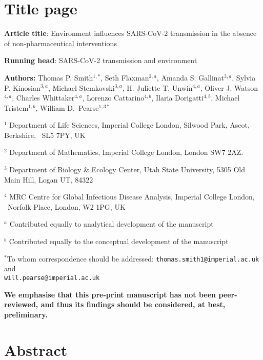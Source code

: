 \documentclass[12pt,english,a4paper]{article}
\begin{document}
\setlength{\parindent}{0pt}

\section*{Title page}

\textbf{Article title}: Environment influences SARS-CoV-2 transmission in the absence of non-pharmaceutical interventions


\textbf{Running head}: SARS-CoV-2 transmission and environment


\textbf{Authors:} Thomas P. Smith$^{1,*}$,
Seth Flaxman$^{2,a}$, Amanda S. Gallinat$^{3,a}$, Sylvia P. Kinosian$^{3,a}$, Michael Stemkovski$^{3,a}$,
H. Juliette T. Unwin$^{4,a}$,
Oliver J. Watson$^{4,a}$, Charles Whittaker$^{4,a}$,
Lorenzo Cattarino$^{4,b}$, Ilaria Dorigatti$^{4,b}$, Michael Tristem$^{1,b}$,
William D.\ Pearse$^{1,3*}$

$^1$ Department of Life Sciences, Imperial College London, Silwood Park, Ascot, Berkshire, \
 SL5 7PY, UK
 
$^2$ Department of Mathematics, Imperial College London, London SW7 2AZ.

$^3$ Department of Biology \& Ecology Center, Utah State University,
5305 Old Main Hill, Logan UT, 84322

$^4$ MRC Centre for Global Infectious Disease Analysis, Imperial College London, \ 
Norfolk Place, London, W2 1PG, UK 

$^a$ Contributed equally to analytical development of the manuscript

$^b$ Contributed equally to the conceptual development of the manuscript

$^*$To whom correspondence should be addressed:
\texttt{thomas.smith1@imperial.ac.uk} and \\
\texttt{will.pearse@imperial.ac.uk}


\textbf{We emphasise that this pre-print manuscript has not been peer-reviewed, and thus its findings should be considered, at best, preliminary.}

\clearpage
\section*{Abstract}
\end{document}
